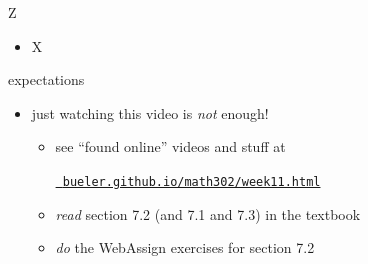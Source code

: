 \documentclass[urlcolor=blue,dvipsnames]{beamer}
\begin{document}


\begin{frame}{Z}

\begin{itemize}
\item X
\end{itemize}
\end{frame}


\begin{frame}{expectations}

\begin{itemize}
\item just watching this video is \emph{not} enough!
     \begin{itemize}
     \item see ``found online'' videos and stuff at

     \centerline{\href{https://bueler.github.io/math302/week11.html}{\tt \color{cyan} bueler.github.io/math302/week11.html}}
     \item \emph{read} section 7.2 (and 7.1 and 7.3) in the textbook
     \item \emph{do} the WebAssign exercises for section 7.2
     \end{itemize}
\end{itemize}
\end{frame}
\end{document}
